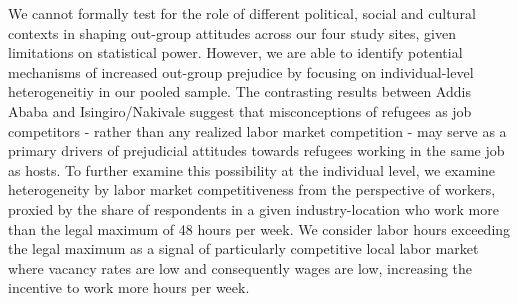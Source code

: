 \documentclass[a4paper,12pt]{article}
\begin{document}
We cannot formally test for the role of different political, social and cultural contexts in shaping out-group attitudes across our four study sites, given limitations on statistical power. However, we are able to identify potential mechanisms of increased out-group prejudice by focusing on individual-level heterogeneitiy in our pooled sample. The contrasting results between Addis Ababa and Isingiro/Nakivale suggest that misconceptions of refugees as job competitors - rather than any realized labor market competition -  may serve as a primary drivers of prejudicial attitudes towards refugees working in the same job as hosts. To further examine this possibility at the individual level, we examine heterogeneity by labor market competitiveness from the perspective of workers, proxied by the share of respondents in a given industry-location who work more than the legal maximum of 48 hours per week. We consider labor hours exceeding the legal maximum as a signal of particularly competitive local labor market where vacancy rates are low and consequently wages are low, increasing the incentive to work more hours per week. 
\end{document}
